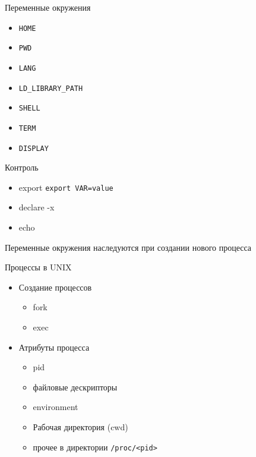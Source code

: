 \documentclass[ignorenonframetext, professionalfonts, hyperref={pdftex, unicode}]{beamer}
\begin{document}
\begin{frame}{Переменные окружения}
  \begin{itemize}
    \item {\tt HOME}
    \item {\tt PWD}
    \item {\tt LANG}
    \item {\tt LD\_LIBRARY\_PATH}
    \item {\tt SHELL}
    \item {\tt TERM}
    \item {\tt DISPLAY}
  \end{itemize}

  Контроль

  \begin{itemize}
    \item export {\tt export VAR=value}
    \item declare -x
    \item echo 
  \end{itemize}

  Переменные окружения наследуются при создании нового процесса
\end{frame}

\begin{frame}{Процессы в UNIX}
  \begin{itemize}
    \item Создание процессов
      \begin{itemize}
        \item fork
        \item exec
      \end{itemize}
    \item Атрибуты процесса
      \begin{itemize}
        \item pid 
        \item файловые дескрипторы
        \item environment
        \item Рабочая директория (cwd)
        \item прочее в директории {\tt /proc/<pid>}
      \end{itemize}
  \end{itemize}
\end{frame}
\end{document}
